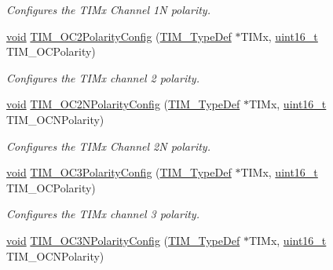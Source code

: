 \begin{DoxyCompactItemize}
\begin{DoxyCompactList}\small\item\em Configures the T\+I\+Mx Channel 1N polarity. \end{DoxyCompactList}\item 
\hyperlink{usb__devapi_8h_afabf60e7f57651d6d595a02c75f07cd0}{void} \hyperlink{group___t_i_m___private___functions_ga6831cacaac1ef50291af94db94450797}{T\+I\+M\+\_\+\+O\+C2\+Polarity\+Config} (\hyperlink{struct_t_i_m___type_def}{T\+I\+M\+\_\+\+Type\+Def} $\ast$T\+I\+Mx, \hyperlink{_p_e___types_8h_a1f1825b69244eb3ad2c7165ddc99c956}{uint16\+\_\+t} T\+I\+M\+\_\+\+O\+C\+Polarity)
\begin{DoxyCompactList}\small\item\em Configures the T\+I\+Mx channel 2 polarity. \end{DoxyCompactList}\item 
\hyperlink{usb__devapi_8h_afabf60e7f57651d6d595a02c75f07cd0}{void} \hyperlink{group___t_i_m___private___functions_ga2fa6ea3a89f446b52b4e699272b70cad}{T\+I\+M\+\_\+\+O\+C2\+N\+Polarity\+Config} (\hyperlink{struct_t_i_m___type_def}{T\+I\+M\+\_\+\+Type\+Def} $\ast$T\+I\+Mx, \hyperlink{_p_e___types_8h_a1f1825b69244eb3ad2c7165ddc99c956}{uint16\+\_\+t} T\+I\+M\+\_\+\+O\+C\+N\+Polarity)
\begin{DoxyCompactList}\small\item\em Configures the T\+I\+Mx Channel 2N polarity. \end{DoxyCompactList}\item 
\hyperlink{usb__devapi_8h_afabf60e7f57651d6d595a02c75f07cd0}{void} \hyperlink{group___t_i_m___private___functions_ga1ef43b03fe666495e80aac9741ae7ab0}{T\+I\+M\+\_\+\+O\+C3\+Polarity\+Config} (\hyperlink{struct_t_i_m___type_def}{T\+I\+M\+\_\+\+Type\+Def} $\ast$T\+I\+Mx, \hyperlink{_p_e___types_8h_a1f1825b69244eb3ad2c7165ddc99c956}{uint16\+\_\+t} T\+I\+M\+\_\+\+O\+C\+Polarity)
\begin{DoxyCompactList}\small\item\em Configures the T\+I\+Mx channel 3 polarity. \end{DoxyCompactList}\item 
\hyperlink{usb__devapi_8h_afabf60e7f57651d6d595a02c75f07cd0}{void} \hyperlink{group___t_i_m___private___functions_gac710acc5b682e892584fc6f089f61dc2}{T\+I\+M\+\_\+\+O\+C3\+N\+Polarity\+Config} (\hyperlink{struct_t_i_m___type_def}{T\+I\+M\+\_\+\+Type\+Def} $\ast$T\+I\+Mx, \hyperlink{_p_e___types_8h_a1f1825b69244eb3ad2c7165ddc99c956}{uint16\+\_\+t} T\+I\+M\+\_\+\+O\+C\+N\+Polarity)

\end{DoxyCompactItemize}
